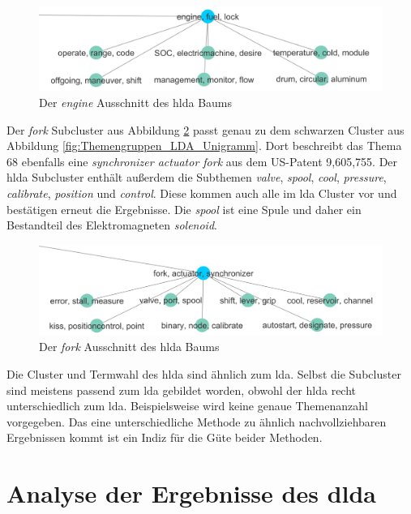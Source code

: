 \begin{figure}[htpb]
	\centering
	\includegraphics[width=\textwidth,keepaspectratio=true]{img/hldaEngine.png}
	\caption{
		Der \emph{engine} Ausschnitt des \gls{hlda} Baums
	}
	\label{fig:hlda_engine}
\end{figure}

Der \emph{fork} Subcluster aus Abbildung \ref{fig:hlda_fork} passt genau zu dem schwarzen Cluster aus Abbildung \ref{fig:Themengruppen_LDA_Unigramm}. Dort beschreibt das Thema 68 ebenfalls eine \emph{synchronizer actuator fork} aus dem US-Patent 9,605,755. Der \gls{hlda} Subcluster enthält außerdem die Subthemen \emph{valve}, \emph{spool}, \emph{cool}, \emph{pressure}, \emph{calibrate}, \emph{position} und \emph{control}. Diese kommen auch alle im \gls{lda} Cluster vor und bestätigen erneut die Ergebnisse. Die \emph{spool} ist eine Spule und daher ein Bestandteil des Elektromagneten \emph{solenoid}.

\begin{figure}[htpb]
	\centering
	\includegraphics[width=\textwidth,keepaspectratio=true]{img/hldaFork.png}
	\caption{
		Der \emph{fork} Ausschnitt des \gls{hlda} Baums
	}
	\label{fig:hlda_fork}
\end{figure}

Die Cluster und Termwahl des \gls{hlda} sind ähnlich zum \gls{lda}. Selbst die Subcluster sind meistens passend zum \gls{lda} gebildet worden, obwohl der \gls{hlda} recht unterschiedlich zum \gls{lda}. Beispielsweise wird keine genaue Themenanzahl vorgegeben. Das eine unterschiedliche Methode zu ähnlich nachvollziehbaren Ergebnissen kommt ist ein Indiz für die Güte beider Methoden.


\section{Analyse der Ergebnisse des \gls{dlda}}

